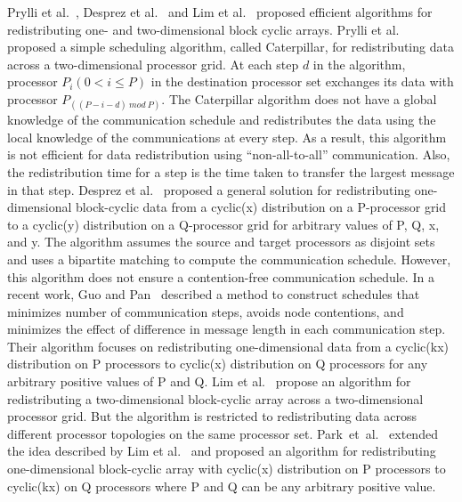 \documentclass[letterpaper]{llncs}
\begin{document}
\vspace{-0.02in}
Prylli et al.~\cite{prylli}, Desprez et al.~\cite{desprez98scheduling} and
Lim et al.~\cite{Lim97}
proposed efficient algorithms for redistributing one- and two-dimensional block cyclic
arrays.
Prylli et al.~\cite{prylli} proposed a simple scheduling algorithm, called Caterpillar,
for redistributing data across a two-dimensional processor grid.
At each step $d$ in the algorithm, processor ${P_i} (0 < i \leq P)$ in the destination
processor set exchanges its data
with processor $P_{((P-i-d)\ mod\ P)}$.
The Caterpillar algorithm does not have a global knowledge of the communication schedule
and redistributes the data using the local knowledge of the communications at every step.
As a result, this algorithm is not efficient for data redistribution using ``non-all-to-all''
communication. Also, the redistribution time for a step is the time taken to transfer the
largest message in that step.
Desprez et al.~\cite{desprez98scheduling} proposed a general solution for redistributing
one-dimensional block-cyclic data from a cyclic(x) distribution
on a P-processor grid to a cyclic(y) distribution on a Q-processor grid for arbitrary values of P, Q, x, and y.
The algorithm assumes the source and target processors as
disjoint sets and uses a bipartite matching to compute the communication schedule. However, this algorithm does not ensure a contention-free communication schedule.
In a recent work, Guo and Pan~\cite{Guo} described a method to construct schedules that minimizes number of communication steps, avoids node contentions, and minimizes the effect of difference in message length in each communication step.
Their algorithm focuses on redistributing one-dimensional data from a cyclic(kx) distribution on P processors to cyclic(x) distribution on Q
processors for any arbitrary positive values of P and Q. 
Lim et al.~\cite{Lim97} propose an algorithm for
redistributing a two-dimensional block-cyclic array across a two-dimensional processor grid. But the algorithm  is restricted to redistributing data across
different processor topologies on the same processor set.
Park~et~al.~\cite{park} extended the idea described by Lim et al.~\cite{Lim97} and proposed an algorithm for redistributing one-dimensional block-cyclic array with cyclic(x)
distribution on P processors to cyclic(kx) on Q processors where P and Q  can be any arbitrary positive value.
\end{document}
